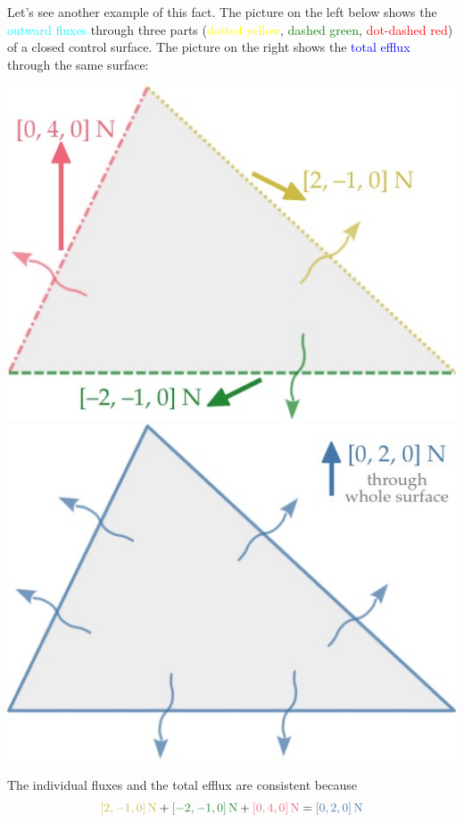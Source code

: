\documentclass[a4paper,12pt,%
onecolumn,oneside,%
british%
]{memoir}
\renewcommand*{\|}[1][]{\nonscript\:#1\vert\nonscript\:\mathopen{}}
\begin{document}
Let's see another example of this fact. The picture on the left below shows the \textcolor{cyan}{outward fluxes} through three parts (\textcolor{yellow}{dotted yellow}, \textcolor{green}{dashed green}, \textcolor{red}{dot-dashed red}) of a closed control surface. The picture on the right shows the \textcolor{blue}{total efflux} through the same surface:
\begin{center}
  \hspace*{\fill}
  \includegraphics[align=t,width=0.4\linewidth]{images/flux_closed_3.jpg}
  \hfill
  \includegraphics[align=t,width=0.4\linewidth]{images/flux_closed_3_sum.jpg}
  \hspace*{\fill}
\end{center}
The individual fluxes and the total efflux are consistent because
\begin{equation*}
  \mathcolor{yellow}{[2,-1,0]\,\unit{N}} +
  \mathcolor{green}{[-2,-1,0]\,\unit{N}} +
  \mathcolor{red}{[0,4,0]\,\unit{N}} =
  \mathcolor{blue}{[0,2,0]\,\unit{N}}
\end{equation*}



\bigskip
\end{document}
